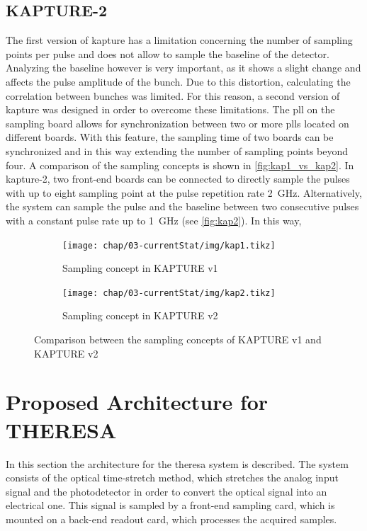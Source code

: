 \subsection{KAPTURE-2}
The first version of \gls{kapture} has a limitation concerning the number of sampling points per pulse and does not allow to sample the baseline of the detector.
Analyzing the baseline however is very important, as it shows a slight change and affects the pulse amplitude of the bunch. 
Due to this distortion, calculating the correlation between bunches was limited. 
For this reason, a second version of \gls{kapture} was designed in order to overcome these limitations. 
The \gls{pll} on the sampling board allows for synchronization between two or more \glspl{pll} located on different boards.
With this feature, the sampling time of two boards can be synchronized and in this way extending the number of sampling points beyond four.
A comparison of the sampling concepts is shown in \autoref{fig:kap1_vs_kap2}.
In \gls{kapture}-2, two front-end boards can be connected to directly sample the pulses with up to eight sampling point at the pulse repetition rate \SI{2}{\GHz}. 
Alternatively, the system can sample the pulse and the baseline between two consecutive pulses with a constant pulse rate up to \SI{1}{\GHz} (see \autoref{fig:kap2}).
In this way, 


\begin{figure}[tbh]
	\centering
	\begin{subfigure}{\textwidth}
		\centering
		\texttt{[image: chap/03-currentStat/img/kap1.tikz]}  
		\caption{Sampling concept in KAPTURE v1}
		\label{fig:kap1}
	\end{subfigure}
	\begin{subfigure}{\textwidth}
		\centering
		\texttt{[image: chap/03-currentStat/img/kap2.tikz]}  
		\caption{Sampling concept in KAPTURE v2}
		\label{fig:kap2}
	\end{subfigure}
	\caption{Comparison between the sampling concepts of KAPTURE v1 and KAPTURE v2}
	\label{fig:kap1_vs_kap2}
\end{figure}






\section{Proposed Architecture for THERESA}
In this section the architecture for the \gls{theresa} system is described.
The system consists of the optical time-stretch method, which stretches the analog input signal and the photodetector in order to convert the optical signal into an electrical one.
This signal is sampled by a front-end sampling card, which is mounted on a back-end readout card, which processes the acquired samples.

